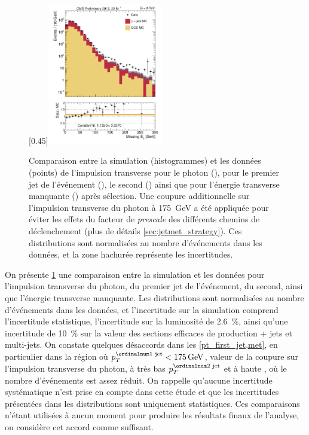 \begin{figure}[p]
    \subcaptionbox{\label{met}}[0.45\textwidth]{\includegraphics[width=0.45\textwidth]{chapitre4/figs/MET_passedID_log.pdf}}
    \caption{Comparaison entre la simulation (histogrammes) et les données (points) de l'impulsion transverse pour le photon (), pour le premier jet de l'événement (), le second () ainsi que pour l'énergie transverse manquante () après sélection. Une coupure additionnelle sur l'impulsion transverse du photon à \SI{175}{\GeV} a été appliquée pour éviter les effets du facteur de \emph{prescale} des différents chemins de déclenchement (plus de détails \cref{sec:jetmet_strategy}). Ces distributions sont normalisées au nombre d'événements dans les données, et la zone hachurée représente les incertitudes.}
    \label{fig:pt_photon_jet}
\end{figure}

\bigskip

On présente \cref{fig:pt_photon_jet} une comparaison entre la simulation et les données pour l'impulsion transverse du photon, du premier jet de l'événement, du second, ainsi que l'énergie transverse manquante. Les distributions sont normalisées au nombre d'événements dans les données, et l'incertitude sur la simulation comprend l'incertitude statistique, l'incertitude sur la luminosité de \SI{2.6}{\%}, ainsi qu'une incertitude de \SI{10}{\%} sur la valeur des sections efficaces de production \Pphoton + jets et multi-jets. On constate quelques désaccords dans les \cref{pt_first_jet,met}, en particulier dans la région où $\ptfjet < \SI{175}{\GeV}$, valeur de la coupure sur l'impulsion transverse du photon, à très bas $\ptsjet$ et à haute \met, où le nombre d'événements est assez réduit. On rappelle qu'aucune incertitude systématique n'est prise en compte dans cette étude et que les incertitudes présentées dans les distributions sont uniquement statistiques. Ces comparaisons n'étant utilisées à aucun moment pour produire les résultats finaux de l'analyse, on considère cet accord comme suffisant.

